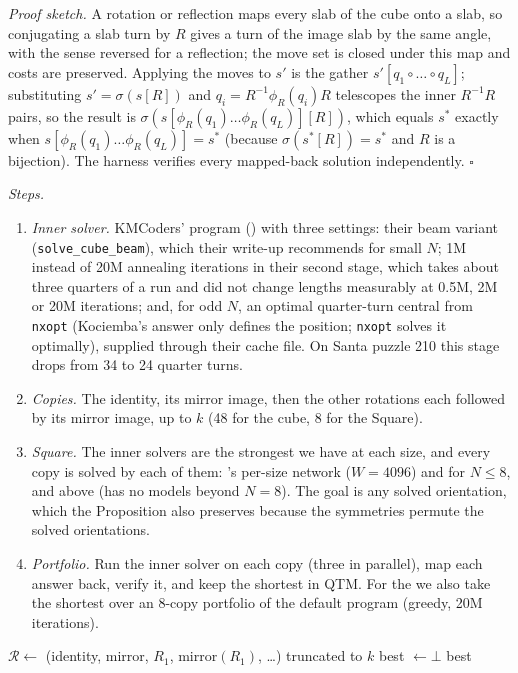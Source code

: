 \emph{Proof sketch.} A rotation or reflection maps every slab of the cube onto a slab, so conjugating a slab turn by $R$ gives
a turn of the image slab by the same angle, with the sense reversed for a reflection; the move set is closed under this map and
costs are preserved. Applying the moves to $s'$ is the gather $s'[q_1\circ\dots\circ q_L]$; substituting $s'=\sigma(s[R])$ and
$q_i=R^{-1}\phi_R(q_i)R$ telescopes the inner $R^{-1}R$ pairs, so the result is $\sigma(s[\phi_R(q_1)\dots\phi_R(q_L)][R])$, which
equals $s^\ast$ exactly when $s[\phi_R(q_1)\dots\phi_R(q_L)]=s^\ast$ (because $\sigma(s^\ast[R])=s^\ast$ and $R$ is a bijection).
The harness verifies every mapped-back solution independently. $\square$

\emph{Steps.}
\begin{enumerate}
\item \emph{Inner solver.} KMCoders' program (\Btwo) with three settings: their beam variant (\texttt{solve\_cube\_beam}), which their
  write-up recommends for small $N$; 1M instead of 20M annealing iterations in their second stage, which takes about three
  quarters of a  run and did not change lengths measurably at 0.5M, 2M or 20M iterations; and, for odd $N$, an optimal
  quarter-turn central  from \texttt{nxopt} (Kociemba's answer only defines the position; \texttt{nxopt} solves it
  optimally), supplied through their cache file. On Santa puzzle 210 this stage drops from 34 to 24 quarter turns.
\item \emph{Copies.} The identity, its mirror image, then the other rotations each followed by its mirror image, up to $k$
  (48 for the cube, 8 for the Square).
\item \emph{Square.} The inner solvers are the strongest we have at each size, and every copy is solved by each of them: \Mfour's
  per-size network ($W{=}4096$) and \FiveC for $N\le8$, \FiveC and \Mthree above (\Mfour has no models beyond $N=8$). The goal is any
  solved orientation, which the Proposition also preserves because the symmetries permute the solved orientations.
\item \emph{Portfolio.} Run the inner solver on each copy (three in parallel), map each answer back, verify it, and keep the
  shortest in QTM. For the  we also take the shortest over an 8-copy portfolio of the default program (greedy, 20M
  iterations).
\end{enumerate}

\begin{algorithm}[t]
\caption{\Mseven: symmetry portfolio}
\label{alg:m7}
\small
{}
$\mathcal{R}\leftarrow$ (identity, mirror, $R_1$, mirror$(R_1)$, \dots) truncated to $k$\;
best $\leftarrow\bot$\;
\Return best\;
\end{algorithm}

